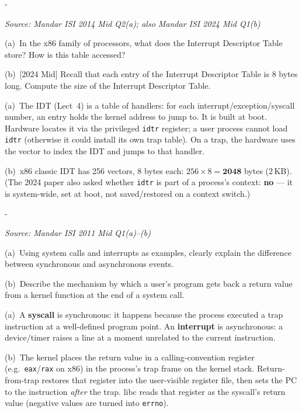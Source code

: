 \documentclass[11pt,a4paper]{article}
\makeatletter
\newcommand{\keepspace}[1]{\par\penalty-100\begingroup
  \setlength{\dimen@}{#1}\dimen@ii\pagegoal\advance\dimen@ii-\pagetotal
  \ifdim\dimen@>\dimen@ii\ifdim\dimen@ii>\z@\vfil\fi\break\fi\endgroup}
\newcounter{qn}[section]
\newenvironment{Qn}[4]{%
  \refstepcounter{qn}\keepspace{7\baselineskip}%
  \begin{tcolorbox}[qboxstyle, title={Q\thesection.\theqn\ \ [#1 \textbar\ #2]\ \ #4}]%
  {\footnotesize\color{g3}\textit{Source: #3}}\par\smallskip%
}{%
  \end{tcolorbox}%
}
\newenvironment{Sol}{%
  \begin{tcolorbox}[sboxstyle, title={Solution}]%
}{%
  \end{tcolorbox}\vspace{0.35em}%
}
\makeatother
\begin{document}
\begin{Qn}{Easy-Medium}{Lect 4}{Mandar ISI 2014 Mid Q2(a); also Mandar ISI 2024 Mid Q1(b)}{What the IDT stores, how it is accessed, and its size}
(a)~In the x86 family of processors, what does the Interrupt Descriptor Table store? How is this table accessed?

(b)~[2024 Mid] Recall that each entry of the Interrupt Descriptor Table is 8 bytes long. Compute the size of the Interrupt Descriptor Table.
\end{Qn}
\begin{Sol}
(a)~The IDT (Lect~4) is a table of handlers: for each interrupt/exception/syscall number, an entry holds the kernel address to jump to. It is built at boot. Hardware locates it via the privileged \texttt{idtr} register; a user process cannot load \texttt{idtr} (otherwise it could install its own trap table). On a trap, the hardware uses the vector to index the IDT and jumps to that handler.

(b)~x86 classic IDT has 256 vectors, 8 bytes each: $256\times 8 = \mathbf{2048}$ bytes (2\,KB). (The 2024 paper also asked whether \texttt{idtr} is part of a process's context: \textbf{no} --- it is system-wide, set at boot, not saved/restored on a context switch.)
\end{Sol}

\begin{Qn}{Easy-Medium}{Lect 4}{Mandar ISI 2011 Mid Q1(a)--(b)}{Synchronous vs.\ asynchronous; getting a syscall's return value}
(a)~Using system calls and interrupts as examples, clearly explain the difference between synchronous and asynchronous events.

(b)~Describe the mechanism by which a user's program gets back a return value from a kernel function at the end of a system call.
\end{Qn}
\begin{Sol}
(a)~A \textbf{syscall} is synchronous: it happens because the process executed a trap instruction at a well-defined program point. An \textbf{interrupt} is asynchronous: a device/timer raises a line at a moment unrelated to the current instruction.

(b)~The kernel places the return value in a calling-convention register (e.g.\ \texttt{eax}/\texttt{rax} on x86) in the process's trap frame on the kernel stack. Return-from-trap restores that register into the user-visible register file, then sets the PC to the instruction \emph{after} the trap. libc reads that register as the syscall's return value (negative values are turned into \texttt{errno}).
\end{Sol}
\end{document}
